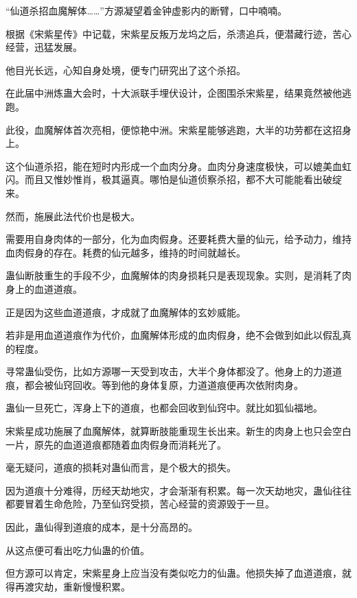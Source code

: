
\begin{this_body}



“仙道杀招血魔解体……”方源凝望着金钟虚影内的断臂，口中喃喃。

根据《宋紫星传》中记载，宋紫星反叛万龙坞之后，杀溃追兵，便潜藏行迹，苦心经营，迅猛发展。

他目光长远，心知自身处境，便专门研究出了这个杀招。

在此届中洲炼蛊大会时，十大派联手埋伏设计，企图围杀宋紫星，结果竟然被他逃跑。

此役，血魔解体首次亮相，便惊艳中洲。宋紫星能够逃跑，大半的功劳都在这招身上。

这个仙道杀招，能在短时内形成一个血肉分身。血肉分身速度极快，可以媲美血虹闪。而且又惟妙惟肖，极其逼真。哪怕是仙道侦察杀招，都不大可能能看出破绽来。

然而，施展此法代价也是极大。

需要用自身肉体的一部分，化为血肉假身。还要耗费大量的仙元，给予动力，维持血肉假身的存在。耗费的仙元越多，维持的时间就越长。

蛊仙断肢重生的手段不少，血魔解体的肉身损耗只是表现现象。实则，是消耗了肉身上的血道道痕。

正是因为这些血道道痕，才成就了血魔解体的玄妙威能。

若非是用血道道痕作为代价，血魔解体形成的血肉假身，绝不会做到如此以假乱真的程度。

寻常蛊仙受伤，比如方源哪一天受到攻击，大半个身体都没了。他身上的力道道痕，都会被仙窍回收。等到他的身体复原，力道道痕便再次依附肉身。

蛊仙一旦死亡，浑身上下的道痕，也都会回收到仙窍中。就比如狐仙福地。

宋紫星成功施展了血魔解体，就算断肢能重现生长出来。新生的肉身上也只会空白一片，原先的血道道痕都随着血肉假身而消耗光了。

毫无疑问，道痕的损耗对蛊仙而言，是个极大的损失。

因为道痕十分难得，历经天劫地灾，才会渐渐有积累。每一次天劫地灾，蛊仙往往都要冒着生命危险，乃至仙窍受损，苦心经营的资源毁于一旦。

因此，蛊仙得到道痕的成本，是十分高昂的。

从这点便可看出吃力仙蛊的价值。

但方源可以肯定，宋紫星身上应当没有类似吃力的仙蛊。他损失掉了血道道痕，就得再渡灾劫，重新慢慢积累。


\end{this_body}
